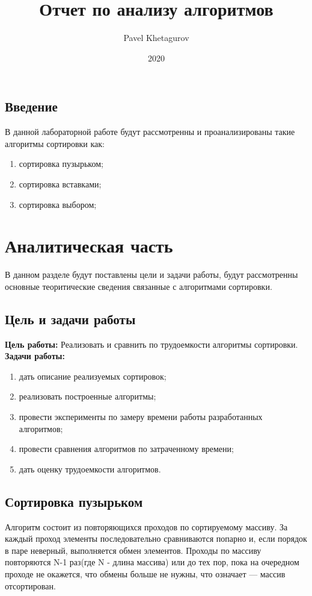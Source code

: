 \documentclass{article}
\title{Отчет по анализу алгоритмов}
\date{2020}
\author{Pavel Khetagurov}
\begin{document}
	
	\newpage
	\tableofcontents
	\newpage
	\begin{center}
	    \section*{Введение}
	\end{center}
		В данной лабораторной работе будут рассмотренны и проанализированы такие алгоритмы сортировки как:
		\begin{enumerate}
		\item сортировка пузырьком;
		\item сортировка вставками;
		\item сортировка выбором;
		\end{enumerate}
	\newpage
	\section{Аналитическая часть}
	В данном разделе будут поставлены цели и задачи работы, будут рассмотренны основные теоритические сведения связанные с алгоритмами сортировки.
		\subsection{Цель и задачи работы}
			\textbf{Цель работы:}
			\newline
			Реализовать и сравнить по трудоемкости алгоритмы сортировки.
			\newline 
			\indent \textbf{Задачи работы:}
			\begin{enumerate}
				\item дать описание реализуемых сортировок;
				\item реализовать построенные алгоритмы;
				\item провести эксперименты по замеру времени работы разработанных алгоритмов;
				\item провести сравнения алгоритмов по затраченному времени;
				\item дать оценку трудоемкости алгоритмов.
			\end{enumerate}
		\subsection{Сортировка пузырьком}
		Алгоритм состоит из повторяющихся проходов по сортируемому массиву. За каждый проход элементы 
		последовательно сравниваются попарно и, если порядок в паре неверный, выполняется обмен 
		элементов. Проходы по массиву повторяются N-1 раз(где N - длина массива) или до тех пор, пока на 
		очередном проходе не окажется, что обмены больше не нужны, что означает — массив отсортирован.\cite{baseSort}
\newline
\end{document}
